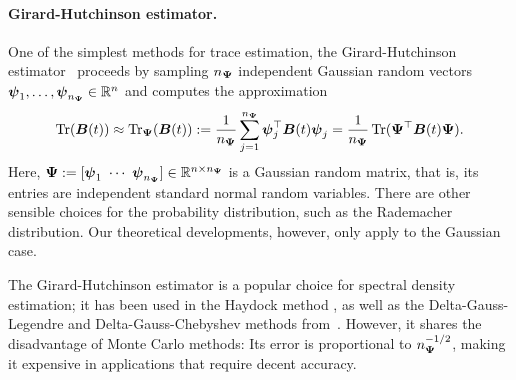 \paragraph{Girard-Hutchinson estimator.} One of the simplest methods for trace estimation, the Girard-Hutchinson estimator~\cite{girard-1989-fast-montecarlo,hutchinson-1990-stochastic-estimator} proceeds by sampling $n_{\boldsymbol{\Psi}}$ independent Gaussian random vectors $\boldsymbol{\psi}_1,\dots, \boldsymbol{\psi}_{n_{\boldsymbol{\Psi}}} \in \mathbb{R}^{n}$
and computes the approximation 
\begin{equation}
    \operatorname{Tr}(\boldsymbol{B}(t)) \approx \operatorname{Tr}_{\boldsymbol{\Psi}}(\boldsymbol{B}(t))
    := \frac{1}{n_{\boldsymbol{\Psi}}} \sum_{j=1}^{n_{\boldsymbol{\Psi}}} \boldsymbol{\psi}_j^{\top} \boldsymbol{B}(t) \boldsymbol{\psi}_j
    = \frac{1}{n_{\boldsymbol{\Psi}}} \operatorname{Tr}( \boldsymbol{\Psi}^{\top} \boldsymbol{B}(t) \boldsymbol{\Psi}).
    \label{equ:hutchinson-trace-estimator}
\end{equation}
Here, $\boldsymbol{\Psi} := [\boldsymbol{\psi}_1 ~ \cdots ~ \boldsymbol{\psi}_{n_{\boldsymbol{\Psi}}}] \in \mathbb{R}^{n \times n_{\boldsymbol{\Psi}}}$ is a Gaussian random matrix, that is, 
its entries are independent standard normal random variables.
There are other sensible choices for the probability distribution, such as the Rademacher distribution. Our theoretical developments, however, only apply to the Gaussian case.

The Girard-Hutchinson estimator is a popular choice for spectral density estimation; it has been used in the Haydock method \cite{haydock-1972-electronic-structure}, as well as the Delta-Gauss-Legendre and Delta-Gauss-Chebyshev methods from~\cite{lin-2016-approximating-spectral, lin-2017-randomized-estimation}. However, it shares the disadvantage of Monte Carlo methods: Its error is proportional to $n^{-1/2}_{\boldsymbol{\Psi}}$, making it expensive in applications that require decent accuracy.

